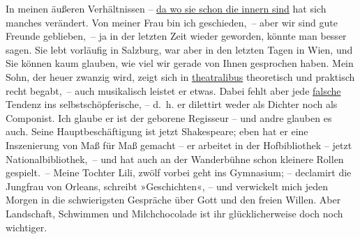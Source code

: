 \pstart
           In meinen äußeren Verhältnissen – \uline{da wo sie schon die
                  innern sind} hat sich manches verändert. Von meiner Frau bin ich geschieden, – aber wir sind
               gute Freunde geblieben, – ja in der letzten Zeit wieder geworden, könnte man besser
               sagen. Sie lebt vorläufig in Salzburg, war aber in
               den letzten Tagen in Wien, und Sie können kaum
               glauben, wie viel wir gerade von Ihnen gesprochen haben. Mein Sohn, der {\pb}heuer zwanzig wird, zeigt sich in \uline{theatralibus} theoretisch und praktisch recht begabt, – auch
               musikalisch leistet er etwas. Dabei fehlt aber jede \uline{falsche} Tendenz ins selbstschöpferische, – d. h. er dilettirt weder als
               Dichter noch als Componist. Ich glaube er ist der geborene Regisseur – und andre
               glauben es auch. Seine Hauptbeschäftigung ist jetzt Shakespeare; eben hat er eine Inszenierung von Maß für Maß gemacht – er arbeitet in der Hofbibliothek – jetzt Nationalbibliothek, – und hat auch an der Wanderbühne schon kleinere Rollen gespielt. – Meine Tochter Lili, zwölf vorbei geht ins Gymnasium; –
               declamirt die Jungfrau von Orleans, schreibt
               »Geschichten«, – und verwickelt mich jeden Morgen in die schwierigsten Gespräche über
               Gott und \introOben{}den\introOben{} freien Willen. Aber Landschaft, Schwimmen und
               Milchchocolade ist ihr glücklicherweise doch noch wichtiger.\pend
           
